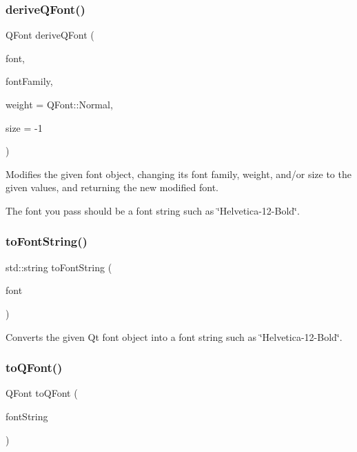\subsubsection{\texorpdfstring{derive\+Q\+Font()}{deriveQFont()}\hspace{0.1cm}{\footnotesize\ttfamily [4/4]}}
{\footnotesize\ttfamily Q\+Font derive\+Q\+Font (\begin{DoxyParamCaption}\item[{const std\+::string \&}]{font,  }\item[{const std\+::string \&}]{font\+Family,  }\item[{Q\+Font\+::\+Weight}]{weight = {\ttfamily QFont\+:\+:Normal},  }\item[{int}]{size = {\ttfamily -\/1} }\end{DoxyParamCaption})\hspace{0.3cm}{\ttfamily [static]}}



Modifies the given font object, changing its font family, weight, and/or size to the given values, and returning the new modified font. 

The font you pass should be a font string such as \char`\"{}\+Helvetica-\/12-\/\+Bold\char`\"{}. \mbox{\label{classGFont_a1e897239fcf0fa78a33f3021a98b0029}} 
\subsubsection{\texorpdfstring{to\+Font\+String()}{toFontString()}}
{\footnotesize\ttfamily std\+::string to\+Font\+String (\begin{DoxyParamCaption}\item[{const Q\+Font \&}]{font }\end{DoxyParamCaption})\hspace{0.3cm}{\ttfamily [static]}}



Converts the given Qt font object into a font string such as \char`\"{}\+Helvetica-\/12-\/\+Bold\char`\"{}. 

\mbox{\label{classGFont_aea0f70979b631219291103391bfacc6e}} 
\subsubsection{\texorpdfstring{to\+Q\+Font()}{toQFont()}\hspace{0.1cm}{\footnotesize\ttfamily [1/2]}}
{\footnotesize\ttfamily Q\+Font to\+Q\+Font (\begin{DoxyParamCaption}\item[{const std\+::string \&}]{font\+String }\end{DoxyParamCaption})\hspace{0.3cm}{\ttfamily [static]}}



